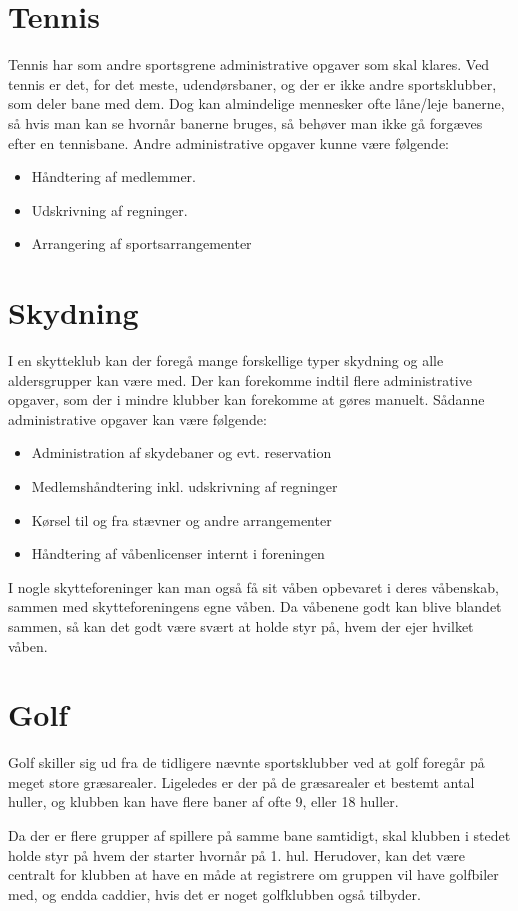 \section{Tennis}
Tennis har som andre sportsgrene administrative opgaver som skal klares. Ved tennis er det, for det meste, udendørsbaner, og der er ikke andre sportsklubber, som deler bane med dem. Dog kan almindelige mennesker ofte låne/leje banerne, så hvis man kan se hvornår banerne bruges, så behøver man ikke gå forgæves efter en tennisbane.
Andre administrative opgaver kunne være følgende:
\begin{itemize}
\item Håndtering af medlemmer.
\item Udskrivning af regninger.
\item Arrangering af sportsarrangementer
\end{itemize}

\section{Skydning}
I en skytteklub kan der foregå mange forskellige typer skydning og alle aldersgrupper kan være med. Der kan forekomme indtil flere administrative opgaver, som der i mindre klubber kan forekomme at gøres manuelt. Sådanne administrative opgaver kan være følgende:
\begin{itemize}
\item Administration af skydebaner og evt. reservation
\item Medlemshåndtering inkl. udskrivning af regninger
\item Kørsel til og fra stævner og andre arrangementer
\item Håndtering af våbenlicenser internt i foreningen
\end{itemize}
I nogle skytteforeninger kan man også få sit våben opbevaret i deres våbenskab, sammen med skytteforeningens egne våben. Da våbenene godt kan blive blandet sammen, så kan det godt være svært at holde styr på, hvem der ejer hvilket våben.

\section{Golf}
Golf skiller sig ud fra de tidligere nævnte sportsklubber ved at golf foregår på meget store græsarealer. Ligeledes er der på de græsarealer et bestemt antal huller, og klubben kan have flere baner af ofte 9, eller 18 huller. 

Da der er flere grupper af spillere på samme bane samtidigt, skal klubben i stedet holde styr på hvem der starter hvornår på 1. hul. Herudover, kan det være centralt for klubben at have en måde at registrere om gruppen vil have golfbiler med, og endda caddier, hvis det er noget golfklubben også tilbyder.

